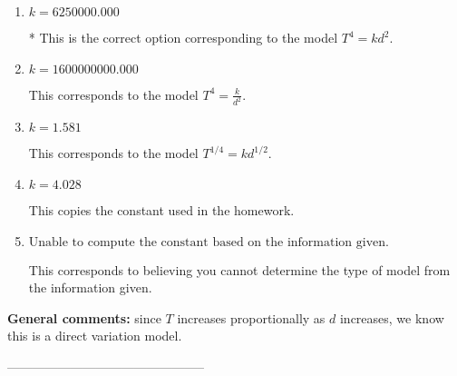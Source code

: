 \documentclass{extbook}[14pt]
\begin{document}
\begin{enumerate}[label=\Alph*.] 
\item $ k = 6250000.000 $ 

 * This is the correct option corresponding to the model $T^{4} = k d^{2}$. 
\item $ k = 1600000000.000 $ 

 This corresponds to the model $T^{4} = \frac{k}{d^{2}}$. 
\item $ k = 1.581 $ 

 This corresponds to the model $T^{1/4} = k d^{1/2}$. 
\item $ k = 4.028 $ 

 This copies the constant used in the homework. 
\item $ \text{Unable to compute the constant based on the information given.} $ 

 This corresponds to believing you cannot determine the type of model from the information given. 
\end{enumerate} 
 
\textbf{General comments:} since $T$ increases proportionally as $d$ increases, we know this is a direct variation model.

-----------------------------------------------
\end{document}
